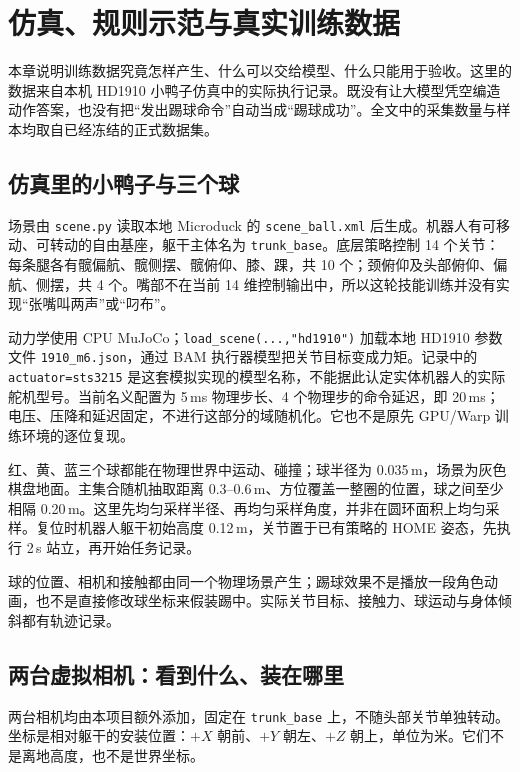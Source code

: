 \chapter{仿真、规则示范与真实训练数据}
\label{chap:data}

本章说明训练数据究竟怎样产生、什么可以交给模型、什么只能用于验收。这里的数据来自本机 HD1910 小鸭子仿真中的实际执行记录。既没有让大模型凭空编造动作答案，也没有把“发出踢球命令”自动当成“踢球成功”。全文中的采集数量与样本均取自已经冻结的正式数据集。

\section{仿真里的小鸭子与三个球}

场景由 \texttt{scene.py} 读取本地 Microduck 的 \texttt{scene\_ball.xml} 后生成。机器人有可移动、可转动的自由基座，躯干主体名为 \texttt{trunk\_base}。底层策略控制 14 个关节：每条腿各有髋偏航、髋侧摆、髋俯仰、膝、踝，共 10 个；颈俯仰及头部俯仰、偏航、侧摆，共 4 个。嘴部不在当前 14 维控制输出中，所以这轮技能训练并没有实现“张嘴叫两声”或“叼布”。

动力学使用 CPU MuJoCo；\texttt{load\_scene(...,"hd1910")} 加载本地 HD1910 参数文件 \texttt{1910\_m6.json}，通过 BAM 执行器模型把关节目标变成力矩。记录中的 \texttt{actuator=sts3215} 是这套模拟实现的模型名称，不能据此认定实体机器人的实际舵机型号。当前名义配置为 5\,ms 物理步长、4 个物理步的命令延迟，即 20\,ms；电压、压降和延迟固定，不进行这部分的域随机化。它也不是原先 GPU/Warp 训练环境的逐位复现。

红、黄、蓝三个球都能在物理世界中运动、碰撞；球半径为 0.035\,m，场景为灰色棋盘地面。主集合随机抽取距离 0.3--0.6\,m、方位覆盖一整圈的位置，球之间至少相隔 0.20\,m。这里先均匀采样半径、再均匀采样角度，并非在圆环面积上均匀采样。复位时机器人躯干初始高度 0.12\,m，关节置于已有策略的 HOME 姿态，先执行 2\,s 站立，再开始任务记录。

球的位置、相机和接触都由同一个物理场景产生；踢球效果不是播放一段角色动画，也不是直接修改球坐标来假装踢中。实际关节目标、接触力、球运动与身体倾斜都有轨迹记录。

\section{两台虚拟相机：看到什么、装在哪里}

两台相机均由本项目额外添加，固定在 \texttt{trunk\_base} 上，不随头部关节单独转动。坐标是相对躯干的安装位置：$+X$ 朝前、$+Y$ 朝左、$+Z$ 朝上，单位为米。它们不是离地高度，也不是世界坐标。

